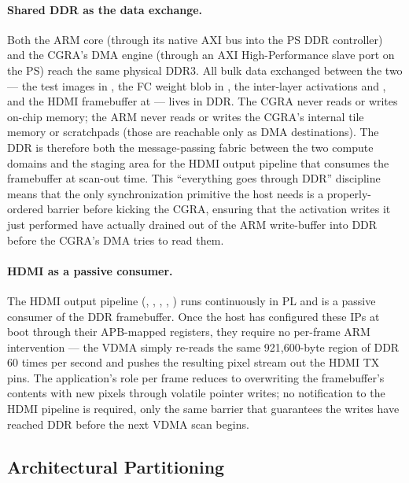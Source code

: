 \paragraph{Shared DDR as the data exchange.}
Both the ARM core (through its native AXI bus into the PS DDR
controller) and the CGRA's DMA engine (through an AXI High-Performance
slave port on the PS) reach the same physical DDR3. All bulk data
exchanged between the two --- the test images in ,
the FC weight blob in , the inter-layer activations
 and , and the HDMI framebuffer at
 --- lives in DDR. The CGRA never reads or writes
on-chip memory; the ARM never reads or writes the CGRA's internal
tile memory or scratchpads (those are reachable only as DMA
destinations). The DDR is therefore both the message-passing fabric
between the two compute domains and the staging area for the HDMI
output pipeline that consumes the framebuffer at scan-out time. This
``everything goes through DDR'' discipline means that the only
synchronization primitive the host needs is a properly-ordered
 barrier before kicking the CGRA, ensuring that the
activation writes it just performed have actually drained out of the
ARM write-buffer into DDR before the CGRA's DMA tries to read them.

\paragraph{HDMI as a passive consumer.}
The HDMI output pipeline (, ,
, , ) runs continuously
in PL and is a passive consumer of the DDR framebuffer. Once the host
has configured these IPs at boot through their APB-mapped registers,
they require no per-frame ARM intervention --- the VDMA simply
re-reads the same 921{,}600-byte region of DDR 60 times per second
and pushes the resulting pixel stream out the HDMI TX pins. The
application's role per frame reduces to overwriting the framebuffer's
contents with new pixels through volatile pointer writes; no
notification to the HDMI pipeline is required, only the same
 barrier that guarantees the writes have reached DDR before
the next VDMA scan begins.

\subsection{Architectural Partitioning}
\label{ssec:partitioning}

